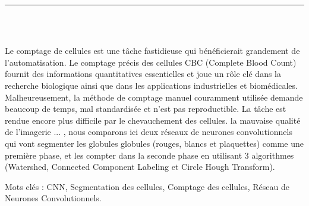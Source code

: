 \vspace*{0.2in}

\thispagestyle{empty}

\begin{center}
    {\color{Black} \rule{3in}{1.4mm} }\\
    \vspace{0.1in}
    \scshape{\fontsize{34}{46}{\bfseries{\color{Black}{Résumé}}}}
    \\
    \vspace{0.6in}
\end{center}
\hspace{\parindent}

\begin{changemargin}{0.9cm}{0.9cm}
Le comptage de cellules est une tâche fastidieuse qui bénéficierait grandement de l'automatisation. Le comptage précis des cellules CBC (Complete Blood Count) fournit des informations quantitatives essentielles et joue un rôle clé dans la recherche biologique ainsi que dans les applications industrielles et biomédicales. Malheureusement, la méthode de comptage manuel couramment utilisée demande beaucoup de temps, mal standardisée et n'est pas reproductible. La tâche est rendue encore plus difficile par le chevauchement des cellules. la mauvaise qualité de l'imagerie ... , nous comparons ici deux réseaux de neurones convolutionnels qui vont segmenter les globules globules (rouges, blancs et plaquettes) comme une première phase, et les compter dans la seconde phase en utilisant 3 algorithmes (Watershed, Connected Component Labeling et Circle Hough Transform).
\end{changemargin}

\vspace{1in}

\begin{changemargin}{0.9cm}{0.9cm}
\hspace{-21pt}
Mots clés : CNN, Segmentation des cellules, Comptage des cellules, Réseau de Neurones Convolutionnels.
\end{changemargin}
